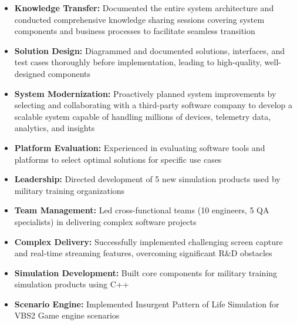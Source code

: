 \documentclass{fullstackdeveloper-ats}
\begin{document}
\begin{itemize}
    \item \textbf{Knowledge Transfer:} Documented the entire system architecture and conducted comprehensive knowledge sharing sessions covering system components and business processes to facilitate seamless transition
    \item \textbf{Solution Design:} Diagrammed and documented solutions, interfaces, and test cases thoroughly before implementation, leading to high-quality, well-designed components
    \item \textbf{System Modernization:} Proactively planned system improvements by selecting and collaborating with a third-party software company to develop a scalable system capable of handling millions of devices, telemetry data, analytics, and insights
    \item \textbf{Platform Evaluation:} Experienced in evaluating software tools and platforms to select optimal solutions for specific use cases
\end{itemize}



\begin{itemize}
    \item \textbf{Leadership:} Directed development of 5 new simulation products used by military training organizations
    \item \textbf{Team Management:} Led cross-functional teams (10 engineers, 5 QA specialists) in delivering complex software projects
    \item \textbf{Complex Delivery:} Successfully implemented challenging screen capture and real-time streaming features, overcoming significant R\&D obstacles
\end{itemize}


\begin{itemize}
    \item \textbf{Simulation Development:} Built core components for military training simulation products using C++
    \item \textbf{Scenario Engine:} Implemented Insurgent Pattern of Life Simulation for VBS2 Game engine scenarios
\end{itemize}

\end{document}
